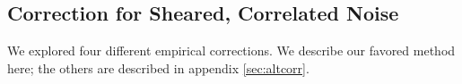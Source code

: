 \documentclass[a4paper,fleqn,usenatbib]{mnras}
\newcommand{\mcalR}{$R$}
\newcommand{\mcalRpsf}{$R^{p}$}
\begin{document}


\subsection{Correction for Sheared, Correlated Noise} \label{sec:fixnoise}

We explored four different empirical corrections.  We describe our favored
method here; the others are described in appendix \ref{sec:altcorr}.

\end{document}

